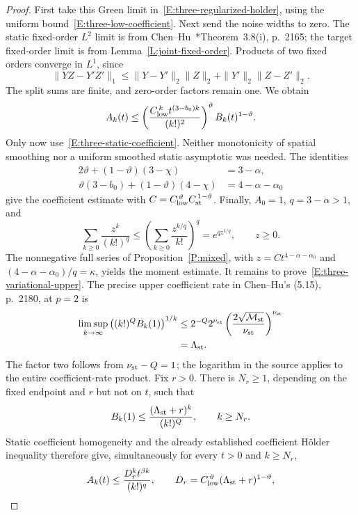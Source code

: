 \documentclass[12pt]{article}
\numberwithin{equation}{section}
\theoremstyle{definition}
\begin{document}
\begin{proof}
  First take this Green limit in~\eqref{E:three-regularized-holder},
  using the uniform bound~\eqref{E:three-low-coefficient}. Next send
  the noise widths to zero. The static fixed-order $L^2$ limit is from
  Chen--Hu~\cite{chen.hu:25:hyperbolic}*{Theorem~3.8(i), p.~2165};
  the target fixed-order limit is from
  Lemma~\ref{L:joint-fixed-order}.
  Products of two fixed orders converge in $L^1$, since
  \[
    \|YZ-Y'Z'\|_1
    \le\|Y-Y'\|_2\|Z\|_2+\|Y'\|_2\|Z-Z'\|_2.
  \]
  The split sums are finite, and zero-order factors remain one.
  We obtain
  \[
    A_k(t)\le
    \left(\frac{C_{\rm low}^{\,k}t^{(3-b_0)k}}{(k!)^2}\right)^\vartheta
    B_k(t)^{1-\vartheta}.
  \]
  Only now use~\eqref{E:three-static-coefficient}. Neither monotonicity
  of spatial smoothing nor a uniform smoothed static asymptotic was
  needed. The identities
  \[
    \begin{split}
      2\vartheta+(1-\vartheta)(3-\chi)&=3-\alpha,\\
      \vartheta(3-b_0)+(1-\vartheta)(4-\chi)&=4-\alpha-\alpha_0
    \end{split}
  \]
  give the coefficient estimate with
  $C=C_{\rm low}^{\,\vartheta}C_{\rm st}^{\,1-\vartheta}$.
  Finally, $A_0=1$, $q=3-\alpha>1$, and
  \[
    \sum_{k\ge0}\frac{z^k}{(k!)^q}
    \le\left(\sum_{k\ge0}\frac{z^{k/q}}{k!}\right)^q
    =e^{qz^{1/q}},\qquad z\ge0.
  \]
  The nonnegative full series of Proposition~\ref{P:mixed}, with
  $z=Ct^{4-\alpha-\alpha_0}$ and
  $(4-\alpha-\alpha_0)/q=\kappa$, yields the moment estimate.
  It remains to prove~\eqref{E:three-variational-upper}. The precise
  upper coefficient rate in Chen--Hu's (5.15), p.~2180, at $p=2$ is
  \[
    \begin{split}
      \limsup_{k\to\infty}
      \left((k!)^Q B_k(1)\right)^{1/k}
      &\le 2^{-Q}2^{\nu_{\rm st}}
      \left(\frac{2\sqrt{\mathcal{M}_{\rm st}}}{\nu_{\rm st}}\right)^{\nu_{\rm st}}\\
      &=\Lambda_{\rm st}.
    \end{split}
  \]
  The factor two follows from $\nu_{\rm st}-Q=1$; the logarithm in
  the source applies to the entire coefficient-rate product.
  Fix $r>0$. There is $N_r\ge1$, depending on the fixed endpoint
  and $r$ but not on $t$, such that
  \[
    B_k(1)\le\frac{(\Lambda_{\rm st}+r)^k}{(k!)^Q},
    \qquad k\ge N_r.
  \]
  Static coefficient homogeneity and the already established
  coefficient H\"older inequality therefore give, simultaneously for
  every $t>0$ and $k\ge N_r$,
  \[
    A_k(t)\le\frac{D_r^k t^{\beta k}}{(k!)^q},\qquad
    D_r=C_{\rm low}^{\,\vartheta}(\Lambda_{\rm st}+r)^{1-\vartheta},
\]
\end{proof}
\end{document}
